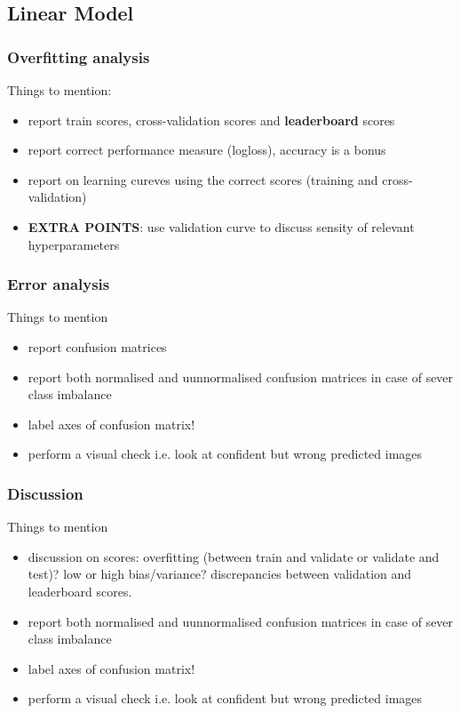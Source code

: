\documentclass[8pt, a4]{article}
\begin{document}
	\subsection{Linear Model}
	\subsubsection{Overfitting analysis}
	Things to mention:
	\begin{itemize}
		\item report train scores, cross-validation scores and \textbf{leaderboard} scores
		\item report correct performance measure (logloss), accuracy is a bonus
		\item report on learning cureves using the correct scores (training and cross-validation)
		\item \textbf{EXTRA POINTS}: use validation curve to discuss sensity of relevant hyperparameters
	\end{itemize}
	
	\subsubsection{Error analysis}
	Things to mention
		\begin{itemize}
		\item report confusion matrices
		\item report both normalised and uunnormalised confusion matrices in case of sever class imbalance
		\item label axes of confusion matrix!
		\item perform a visual check i.e. look at confident but wrong predicted images 
	\end{itemize}

	\subsubsection{Discussion}
	Things to mention
	\begin{itemize}
		\item discussion on scores: overfitting (between train and validate or validate and test)? low or high bias/variance? discrepancies between validation and leaderboard scores.
		\item report both normalised and uunnormalised confusion matrices in case of sever class imbalance
		\item label axes of confusion matrix!
		\item perform a visual check i.e. look at confident but wrong predicted images 
	\end{itemize}
\end{document}
